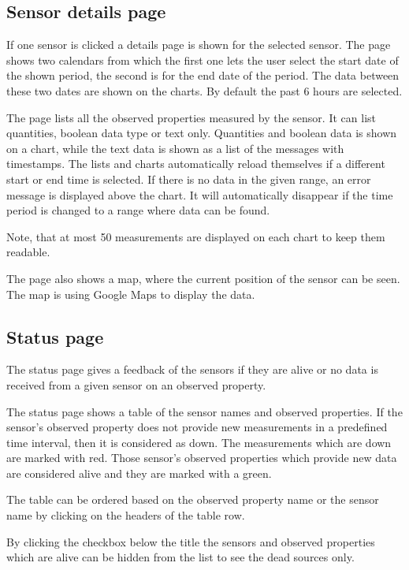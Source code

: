 \subsection{Sensor details page}
If one sensor is clicked a details page is shown for the selected sensor. The  page shows two calendars from which the first one lets the user select the start date of the shown period, the second is for the end date of the period. The data between these two dates are shown on the charts. By default the past 6 hours are selected. 

The page lists all the observed properties measured by the sensor. It can list quantities, boolean data type or text only. Quantities and boolean data is shown on a chart, while the text data is shown as a list of the messages with timestamps. The lists and charts automatically reload themselves if a different start or end time is selected. If there is no data in the given range, an error message is displayed above the chart. It will automatically disappear if the time period is changed to a range where data can be found. 

Note, that at most 50 measurements are  displayed on each chart to keep them readable.

The page also shows a map, where the current position of the sensor can be seen. The map is using Google Maps to display the data.

\subsection{Status page}

The status page gives a feedback of the sensors if they are alive or no data is received from a given sensor on an observed property.

The status page shows a table of the sensor names and observed properties. If the sensor's observed property does not provide new measurements in a predefined time interval, then it is considered as down. The measurements which are down are marked with red. Those sensor's observed properties which provide new data are considered alive and they are marked with a green. 

The table can be ordered based on the observed property name or the sensor name by clicking on the headers of the table row. 

By clicking the checkbox below the title the sensors and observed properties which are alive can be hidden from the list to see the dead sources only.

